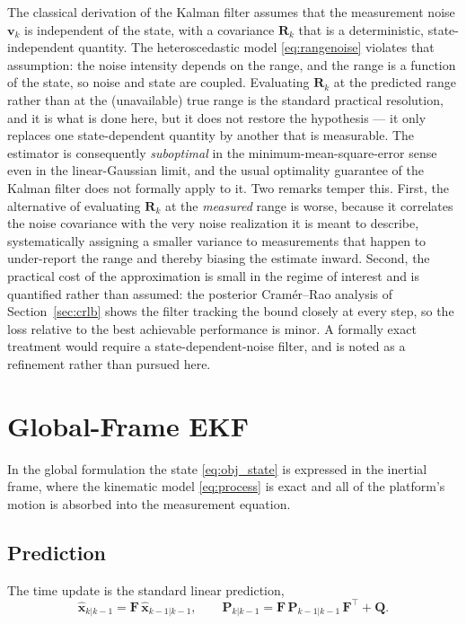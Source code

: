 \begin{remark}
\label{rem:statedep_R}
The classical derivation of the Kalman filter assumes that the measurement noise
$\bm{v}_k$ is independent of the state, with a covariance $\bm{R}_k$ that is a
deterministic, state-independent quantity. The heteroscedastic model
\eqref{eq:rangenoise} violates that assumption: the noise intensity depends on the
range, and the range is a function of the state, so noise and state are coupled.
Evaluating $\bm{R}_k$ at the predicted range rather than at the (unavailable) true
range is the standard practical resolution, and it is what is done here, but it
does not restore the hypothesis --- it only replaces one state-dependent quantity
by another that is measurable. The estimator is consequently \emph{suboptimal} in
the minimum-mean-square-error sense even in the linear-Gaussian limit, and the
usual optimality guarantee of the Kalman filter does not formally apply to it. Two
remarks temper this. First, the alternative of evaluating $\bm{R}_k$ at the
\emph{measured} range is worse, because it correlates the noise covariance with
the very noise realization it is meant to describe, systematically assigning a
smaller variance to measurements that happen to under-report the range and thereby
biasing the estimate inward. Second, the practical cost of the approximation is
small in the regime of interest and is quantified rather than assumed: the
posterior Cram\'er--Rao analysis of Section~\ref{sec:crlb} shows the filter
tracking the bound closely at every step, so the loss relative to the best
achievable performance is minor. A formally exact treatment would require a
state-dependent-noise filter, and is noted as a refinement rather than pursued
here.
\end{remark}

\section{Global-Frame EKF}
\label{sec:global}

In the global formulation the state \eqref{eq:obj_state} is expressed in the
inertial frame, where the kinematic model \eqref{eq:process} is exact and all of
the platform's motion is absorbed into the measurement equation.

\subsection{Prediction}
The time update is the standard linear prediction,
\begin{equation}
  \hat{\bm{x}}_{k|k-1} = \bm{F}\,\hat{\bm{x}}_{k-1|k-1}, \qquad
  \bm{P}_{k|k-1} = \bm{F}\,\bm{P}_{k-1|k-1}\,\bm{F}^{\top} + \bm{Q}.
  \label{eq:gpredict}
\end{equation}

